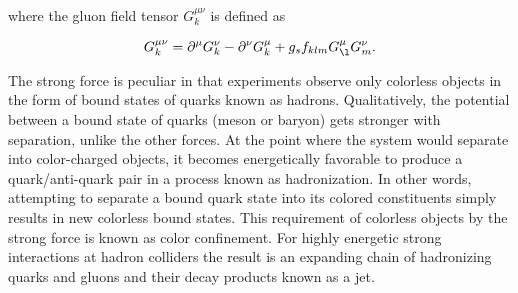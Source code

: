 where the gluon field tensor $G_{k}^{\mu\nu}$ is defined as

\begin{equation} \label{eq:qcd:gluon_tensor}
G_{k}^{\mu\nu} = \partial^{\mu}G_{k}^{\nu} - \partial^{\nu}G_{k}^{\mu} +
g_{s}f_{klm}G_{\l}^{\mu}G_{m}^{\nu}.
\end{equation}

The strong force is peculiar in that experiments observe only colorless objects
in the form of bound states of quarks known as hadrons.  Qualitatively, the
potential between a bound state of quarks (meson or baryon) gets stronger with
separation, unlike the other forces.  At the point where the system would
separate into color-charged objects, it becomes energetically favorable to
produce a quark/anti-quark pair in a process known as hadronization.  In other
words, attempting to separate a bound quark state into its colored constituents
simply results in new colorless bound states.  This requirement of colorless
objects by the strong force is known as color confinement. For highly energetic
strong interactions at hadron colliders the result is an expanding chain of
hadronizing quarks and gluons and their decay products known as a jet.

